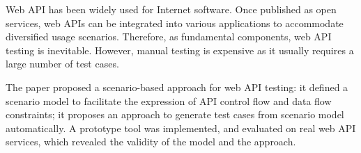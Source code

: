 
\begin{eabstract}
Web API has been widely used for Internet software. Once published as open services, web APIs can be integrated into various applications to accommodate diversified usage scenarios. Therefore, as fundamental components, web API testing is inevitable. However, manual testing is expensive as it usually requires a large number of test cases.

The paper proposed a scenario-based approach for web API testing: it defined a scenario model to facilitate the expression of API control flow and data flow constraints; it proposes an approach to generate test cases from scenario model automatically. A prototype tool was implemented, and evaluated on real web API services, which revealed the validity of the model and the approach.
\end{eabstract}

